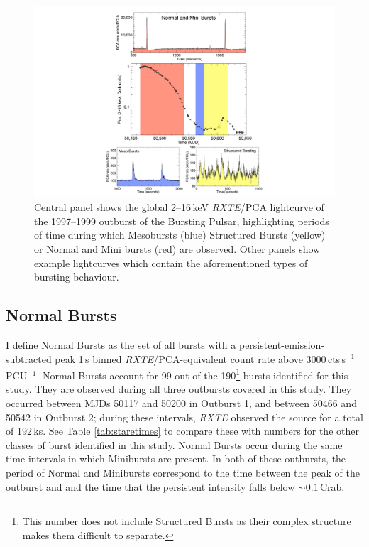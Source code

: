 \begin{figure}
  \centering
  \includegraphics[width=.9\linewidth, trim={9.5cm 0cm 10cm 0cm},clip]{images/obevo2.pdf}
  \caption[Lightcurve of the 1997--1999 outburst of the Bursting Pulsar, highlighting periods of time during which Mesobursts, Structured Bursts or Normal and Mini bursts are observed.]{\small Central panel shows the global 2--16\,keV \indexpca\textit{RXTE}/PCA lightcurve of the 1997--1999 outburst of the Bursting Pulsar, highlighting periods of time during which Mesobursts (blue) Structured Bursts (yellow) or Normal and Mini bursts (red) are observed.  Other panels show example lightcurves which contain the aforementioned types of bursting behaviour.}
  \label{fig:ob_evo2}
\end{figure}

\subsection{Normal Bursts}

\label{sec:Normal_Bursts}

\par I define Normal Bursts as the set of all bursts with a persistent-emission-subtracted peak 1\,s binned \indexpca\textit{RXTE}/PCA-equivalent count rate above 3000\,cts\,s$^{-1}$\,PCU$^{-1}$.  Normal Bursts account for 99 out of the 190\footnote{This number does not include Structured Bursts as their complex structure makes them difficult to separate.} bursts identified for this study.  They are observed during all three outbursts covered in this study.  They occurred between MJDs 50117 and 50200 in Outburst 1, and between 50466 and 50542 in Outburst 2; during these intervals, \indexrxte\textit{RXTE} observed the source for a total of 192\,ks.  See Table \ref{tab:staretimes} to compare these with numbers for the other classes of burst identified in this study.  Normal Bursts occur during the same time intervals in which Minibursts are present.  In both of these outbursts, the period of Normal and Minibursts correspond to the time between the peak of the outburst and and the time that the persistent intensity falls below $\sim0.1$\,Crab.

